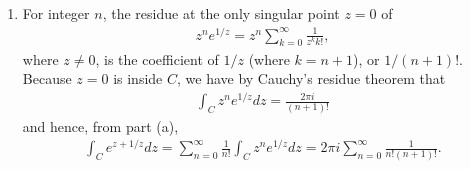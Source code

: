 \documentclass[a4paper,12pt]{article}
\begin{document}
\begin{enumerate}
\begin{enumerate}
            \item
                For integer $n$, the residue at the only singular point $z = 0$ of
                \begin{align*}
                    z^n e^{1/z} = z^n \sum_{k = 0}^\infty \frac{1}{z^k k!},
                \end{align*}
                where $z \neq 0$, is the coefficient of $1/z$ (where $k = n + 1$), or $1/(n + 1)!$. Because $z = 0$ is inside $C$, we have by Cauchy's residue theorem that
                \begin{align*}
                    \int_C z^n e^{1/z} dz = \frac{2\pi i}{(n + 1)!}
                \end{align*}
                and hence, from part (a),
                \begin{align*}
                    \int_C e^{z + 1/z} dz = \sum_{n = 0}^\infty \frac{1}{n!} \int_C z^n e^{1/z} dz = 2\pi i \sum_{n = 0}^\infty \frac{1}{n! (n + 1)!}.
                \end{align*}
        \end{enumerate}
\end{enumerate}
\end{document}
